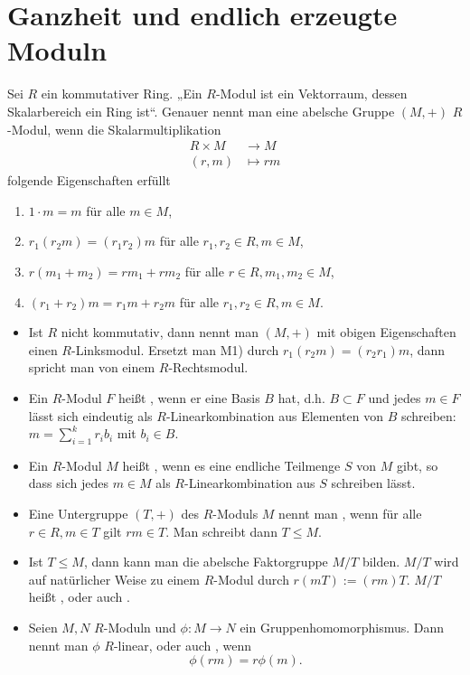\chapter{Ganzheit und endlich erzeugte Moduln} \label{chap:5}


Sei $R$ ein kommutativer Ring.
„Ein $R$-Modul ist ein Vektorraum, dessen Skalarbereich ein Ring ist“.
Genauer nennt man eine abelsche Gruppe $(M, +)$ $R$-Modul, wenn die Skalarmultiplikation
\begin{align*}
	R \times M &\to M \\
	(r,m) &\mapsto rm
\end{align*}
folgende Eigenschaften erfüllt
\begin{enumerate}[M1)]
	\item
		$1\cdot m = m$ für alle $m \in M$,
	\item
		$r_1 (r_2 m) = (r_1 r_2) m$ für alle $r_1, r_2 \in R, m\in M$,
	\item
		$r(m_1 + m_2) = rm_1 + rm_2$ für alle $r \in R, m_1, m_2 \in M$,
	\item
		$(r_1 + r_2)m = r_1 m + r_2 m$ für alle $r_1, r_2 \in R, m \in M$.
\end{enumerate}
\begin{note}
	\begin{itemize}
		\item
			Ist $R$ nicht kommutativ, dann nennt man $(M, +)$ mit obigen Eigenschaften einen $R$-Linksmodul.
			Ersetzt man M1) durch $r_1(r_2m) = (r_2r_1) m$, dann spricht man von einem $R$-Rechtsmodul.
		\item
			Ein $R$-Modul $F$ heißt , wenn er eine Basis $B$ hat, d.h. $B \subset F$ und jedes $m \in F$ lässt sich eindeutig als $R$-Linearkombination aus Elementen von $B$ schreiben: $m = \sum_{i=1}^k r_i b_i$ mit $b_i \in B$.
		\item
			Ein $R$-Modul $M$ heißt , wenn es eine endliche Teilmenge $S$ von $M$ gibt, so dass sich jedes $m \in M$ als $R$-Linearkombination aus $S$ schreiben lässt.
		\item
			Eine Untergruppe $(T, +)$ des $R$-Moduls $M$ nennt man , wenn für alle $r \in R, m \in T$ gilt $rm \in T$.
			Man schreibt dann $T \le M$.
		\item
			Ist $T \le M$, dann kann man die abelsche Faktorgruppe $M / T$ bilden.
			$M / T$ wird auf natürlicher Weise zu einem $R$-Modul durch $r(mT) := (rm)T$.
			$M / T$ heißt , oder auch .
		\item
			Seien $M, N$ $R$-Moduln und $\phi: M \to N$ ein Gruppenhomomorphismus.
			Dann nennt man $\phi$ $R$-linear, oder auch , wenn
			\[
				\phi(rm) = r\phi(m).
			\]
	\end{itemize}
\end{note}

